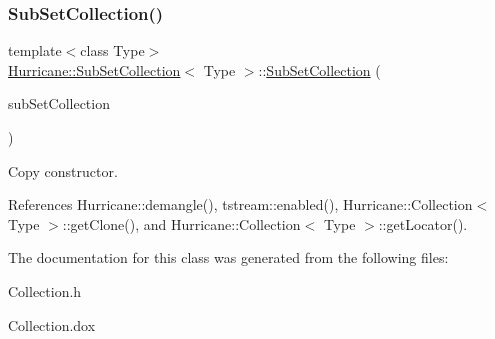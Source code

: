 \subsubsection{\texorpdfstring{Sub\+Set\+Collection()}{SubSetCollection()}\hspace{0.1cm}{\footnotesize\ttfamily [2/2]}}
{\footnotesize\ttfamily template$<$class Type$>$ \\
\hyperlink{classHurricane_1_1SubSetCollection}{Hurricane\+::\+Sub\+Set\+Collection}$<$ Type $>$\+::\hyperlink{classHurricane_1_1SubSetCollection}{Sub\+Set\+Collection} (\begin{DoxyParamCaption}\item[{const \hyperlink{classHurricane_1_1SubSetCollection}{Sub\+Set\+Collection}$<$ Type $>$ \&}]{sub\+Set\+Collection }\end{DoxyParamCaption})\hspace{0.3cm}{\ttfamily [inline]}}

Copy constructor. 

References Hurricane\+::demangle(), tstream\+::enabled(), Hurricane\+::\+Collection$<$ Type $>$\+::get\+Clone(), and Hurricane\+::\+Collection$<$ Type $>$\+::get\+Locator().



The documentation for this class was generated from the following files\+:\begin{DoxyCompactItemize}
\item 
Collection.\+h\item 
Collection.\+dox\end{DoxyCompactItemize}
